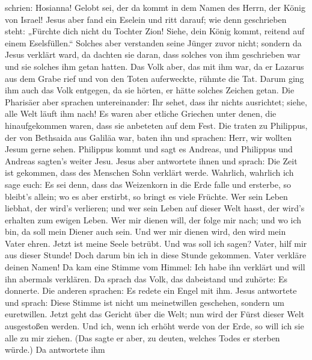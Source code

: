 schrien: Hosianna! Gelobt sei, der da kommt in dem Namen des Herrn, der
König von Israel!  Jesus aber fand ein Eselein und ritt
darauf; wie denn geschrieben steht:  „Fürchte dich nicht du
Tochter Zion! Siehe, dein König kommt, reitend auf einem Eselsfüllen.``
 Solches aber verstanden seine Jünger zuvor nicht; sondern
da Jesus verklärt ward, da dachten sie daran, dass solches von ihm
geschrieben war und sie solches ihm getan hatten.  Das Volk
aber, das mit ihm war, da er Lazarus aus dem Grabe rief und von den
Toten auferweckte, rühmte die Tat.  Darum ging ihm auch das
Volk entgegen, da sie hörten, er hätte solches Zeichen getan.
 Die Pharisäer aber sprachen untereinander: Ihr sehet, dass
ihr nichts ausrichtet; siehe, alle Welt läuft ihm nach!  Es
waren aber etliche Griechen unter denen, die hinaufgekommen waren, dass
sie anbeteten auf dem Fest.  Die traten zu Philippus, der
von Bethsaida aus Galiläa war, baten ihn und sprachen: Herr, wir wollten
Jesum gerne sehen.  Philippus kommt und sagt es Andreas,
und Philippus und Andreas sagten's weiter Jesu.  Jesus aber
antwortete ihnen und sprach: Die Zeit ist gekommen, dass des Menschen
Sohn verklärt werde.  Wahrlich, wahrlich ich sage euch: Es
sei denn, dass das Weizenkorn in die Erde falle und ersterbe, so
bleibt's allein; wo es aber erstirbt, so bringt es viele Früchte.
 Wer sein Leben liebhat, der wird's verlieren; und wer sein
Leben auf dieser Welt hasst, der wird's erhalten zum ewigen Leben.
 Wer mir dienen will, der folge mir nach; und wo ich bin,
da soll mein Diener auch sein. Und wer mir dienen wird, den wird mein
Vater ehren.  Jetzt ist meine Seele betrübt. Und was soll
ich sagen? Vater, hilf mir aus dieser Stunde! Doch darum bin ich in
diese Stunde gekommen.  Vater verkläre deinen Namen! Da kam
eine Stimme vom Himmel: Ich habe ihn verklärt und will ihn abermals
verklären.  Da sprach das Volk, das dabeistand und zuhörte:
Es donnerte. Die anderen sprachen: Es redete ein Engel mit ihm.
 Jesus antwortete und sprach: Diese Stimme ist nicht um
meinetwillen geschehen, sondern um euretwillen.  Jetzt geht
das Gericht über die Welt; nun wird der Fürst dieser Welt ausgestoßen
werden.  Und ich, wenn ich erhöht werde von der Erde, so
will ich sie alle zu mir ziehen.  (Das sagte er aber, zu
deuten, welches Todes er sterben würde.)  Da antwortete ihm

